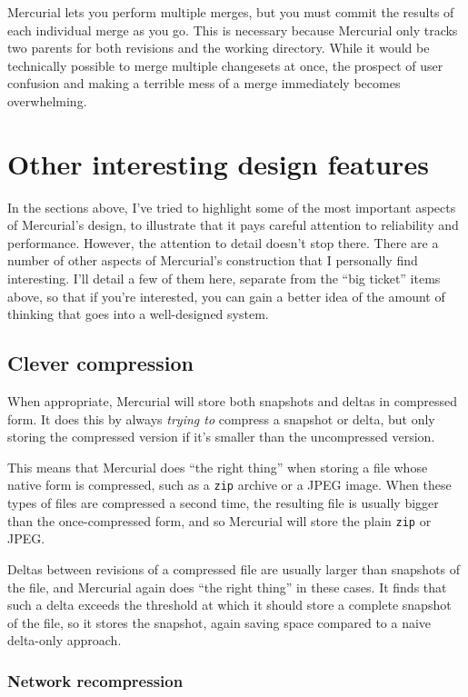 Mercurial lets you perform multiple merges, but you must commit the
results of each individual merge as you go.  This is necessary because
Mercurial only tracks two parents for both revisions and the working
directory.  While it would be technically possible to merge multiple
changesets at once, the prospect of user confusion and making a
terrible mess of a merge immediately becomes overwhelming.

\section{Other interesting design features}

In the sections above, I've tried to highlight some of the most
important aspects of Mercurial's design, to illustrate that it pays
careful attention to reliability and performance.  However, the
attention to detail doesn't stop there.  There are a number of other
aspects of Mercurial's construction that I personally find
interesting.  I'll detail a few of them here, separate from the ``big
ticket'' items above, so that if you're interested, you can gain a
better idea of the amount of thinking that goes into a well-designed
system.

\subsection{Clever compression}

When appropriate, Mercurial will store both snapshots and deltas in
compressed form.  It does this by always \emph{trying to} compress a
snapshot or delta, but only storing the compressed version if it's
smaller than the uncompressed version.

This means that Mercurial does ``the right thing'' when storing a file
whose native form is compressed, such as a \texttt{zip} archive or a
JPEG image.  When these types of files are compressed a second time,
the resulting file is usually bigger than the once-compressed form,
and so Mercurial will store the plain \texttt{zip} or JPEG.

Deltas between revisions of a compressed file are usually larger than
snapshots of the file, and Mercurial again does ``the right thing'' in
these cases.  It finds that such a delta exceeds the threshold at
which it should store a complete snapshot of the file, so it stores
the snapshot, again saving space compared to a naive delta-only
approach.

\subsubsection{Network recompression}

